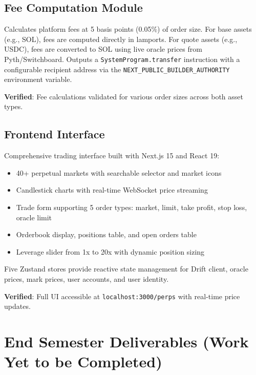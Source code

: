\documentclass[12pt,a4paper]{article}
\begin{document}
\subsection{Fee Computation Module}

Calculates platform fees at 5 basis points (0.05\%) of order size. For base assets (e.g., SOL), fees are computed directly in lamports. For quote assets (e.g., USDC), fees are converted to SOL using live oracle prices from Pyth/Switchboard. Outputs a \texttt{SystemProgram.transfer} instruction with a configurable recipient address via the \texttt{NEXT\_PUBLIC\_BUILDER\_AUTHORITY} environment variable.

\textbf{Verified}: Fee calculations validated for various order sizes across both asset types.

\subsection{Frontend Interface}

Comprehensive trading interface built with Next.js 15 and React 19:

\begin{itemize}
    \item 40+ perpetual markets with searchable selector and market icons
    \item Candlestick charts with real-time WebSocket price streaming
    \item Trade form supporting 5 order types: market, limit, take profit, stop loss, oracle limit
    \item Orderbook display, positions table, and open orders table
    \item Leverage slider from 1x to 20x with dynamic position sizing
\end{itemize}

Five Zustand stores provide reactive state management for Drift client, oracle prices, mark prices, user accounts, and user identity.

\textbf{Verified}: Full UI accessible at \texttt{localhost:3000/perps} with real-time price updates.



\section{End Semester Deliverables (Work Yet to be Completed)}
\end{document}
